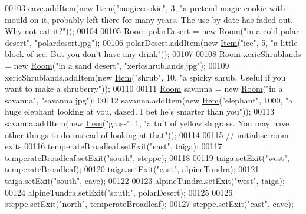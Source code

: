 \begin{DoxyCode}
00103         cave.addItem(\textcolor{keyword}{new} \hyperlink{classItem}{Item}(\textcolor{stringliteral}{"magiccookie"}, 3, \textcolor{stringliteral}{"a pretend magic cookie with mould on it, probably left
       there for many years. The use-by date has faded out. Why not eat it?"}));
00104 
00105         \hyperlink{classRoom}{Room} polarDesert = \textcolor{keyword}{new} \hyperlink{classRoom}{Room}(\textcolor{stringliteral}{"in a cold polar desert"}, \textcolor{stringliteral}{"polardesert.jpg"});
00106         polarDesert.addItem(\textcolor{keyword}{new} \hyperlink{classItem}{Item}(\textcolor{stringliteral}{"ice"}, 5, \textcolor{stringliteral}{"a little block of ice. But you don't have any drink"}));
00107 
00108         \hyperlink{classRoom}{Room} xericShrublands = \textcolor{keyword}{new} \hyperlink{classRoom}{Room}(\textcolor{stringliteral}{"in a sand desert"}, \textcolor{stringliteral}{"xericshrublands.jpg"});
00109         xericShrublands.addItem(\textcolor{keyword}{new} \hyperlink{classItem}{Item}(\textcolor{stringliteral}{"shrub"}, 10, \textcolor{stringliteral}{"a spicky shrub. Useful if you want to make a
       shruberry"}));
00110 
00111         \hyperlink{classRoom}{Room} savanna = \textcolor{keyword}{new} \hyperlink{classRoom}{Room}(\textcolor{stringliteral}{"in a savanna"}, \textcolor{stringliteral}{"savanna.jpg"});
00112         savanna.addItem(\textcolor{keyword}{new} \hyperlink{classItem}{Item}(\textcolor{stringliteral}{"elephant"}, 1000, \textcolor{stringliteral}{"a huge elephant looking at you, dazed. I bet he's
       smarter than you"}));
00113         savanna.addItem(\textcolor{keyword}{new} \hyperlink{classItem}{Item}(\textcolor{stringliteral}{"grass"}, 1, \textcolor{stringliteral}{"a tuft of yellowish grass. You may have other things to
       do instead of looking at that"}));
00114 
00115         \textcolor{comment}{// initialise room exits}
00116         temperateBroadleaf.setExit(\textcolor{stringliteral}{"east"}, taiga);
00117         temperateBroadleaf.setExit(\textcolor{stringliteral}{"south"}, steppe);
00118 
00119         taiga.setExit(\textcolor{stringliteral}{"west"}, temperateBroadleaf);
00120         taiga.setExit(\textcolor{stringliteral}{"east"}, alpineTundra);
00121         taiga.setExit(\textcolor{stringliteral}{"south"}, cave);
00122 
00123         alpineTundra.setExit(\textcolor{stringliteral}{"west"}, taiga);
00124         alpineTundra.setExit(\textcolor{stringliteral}{"south"}, polarDesert);
00125 
00126         steppe.setExit(\textcolor{stringliteral}{"north"}, temperateBroadleaf);
00127         steppe.setExit(\textcolor{stringliteral}{"east"}, cave);

\end{DoxyCode}
